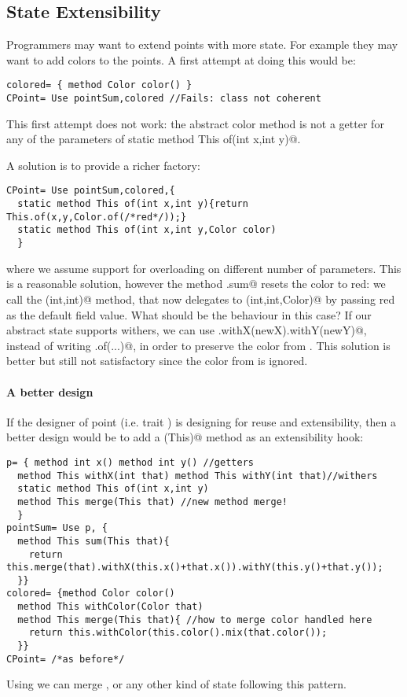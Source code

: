 \subsection{State Extensibility}
Programmers may want to extend points with more state. For example 
they may want to add colors to the points. A first attempt at doing
this would be:
\saveSpace\saveSpace
\begin{lstlisting}
colored= { method Color color() }
CPoint= Use pointSum,colored //Fails: class not coherent
\end{lstlisting}
\saveSpace\saveSpace 
This first attempt does not work: the abstract color method
is not a getter for any of the parameters of 
\Q@ static method This of(int x,int y)@. 

\noindent
A solution is to provide a richer factory:
\saveSpace\saveSpace 
\begin{lstlisting}
CPoint= Use pointSum,colored,{
  static method This of(int x,int y){return This.of(x,y,Color.of(/*red*/));}
  static method This of(int x,int y,Color color)
  }
\end{lstlisting}
\saveSpace\saveSpace 
\noindent 
where we assume support for overloading on different number of parameters.
This is a reasonable solution, however the method \Q@CPoint.sum@ resets
the color to red: we call the \Q@of(int,int)@ method, that now
delegates to \Q@of(int,int,Color)@ by passing red as the default field
value.  What should be the behaviour in this case?  If our abstract
state supports withers, we can use
\Q@this.withX(newX).withY(newY)@, instead of writing \Q@This.of(...)@, in order to preserve the color from
\Q@this@.  This solution is better but still not satisfactory since the color from \Q@that@ is ignored.

\paragraph{A better design}
If the designer of point (i.e. trait \Q@p@) is designing for reuse and extensibility, then 
a better design would be to add a \Q@merge(This)@ method as an extensibility hook: 
\saveSpace\saveSpace \begin{lstlisting}
p= { method int x() method int y() //getters
  method This withX(int that) method This withY(int that)//withers
  static method This of(int x,int y)
  method This merge(This that) //new method merge!
  }
pointSum= Use p, { 
  method This sum(This that){
    return this.merge(that).withX(this.x()+that.x()).withY(this.y()+that.y());
  }}
colored= {method Color color()
  method This withColor(Color that)
  method This merge(This that){ //how to merge color handled here
    return this.withColor(this.color().mix(that.color());
  }}
CPoint= /*as before*/
\end{lstlisting} \saveSpace\saveSpace 
  \noindent Using \Q@withers@ we can merge \Q@color@s, or any other kind of state 
  following this pattern.%

